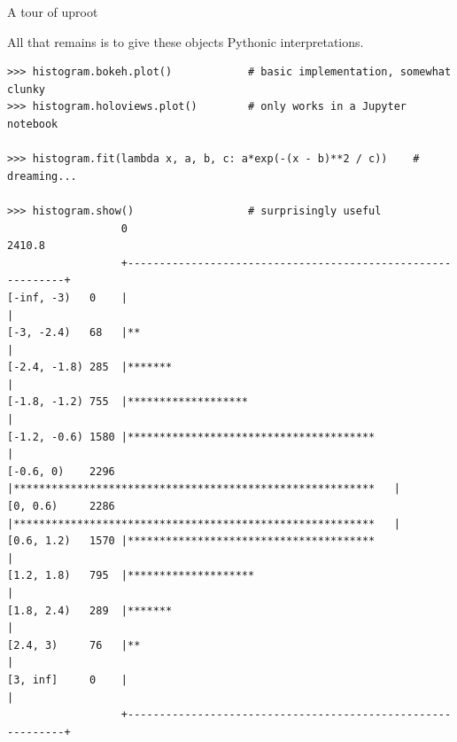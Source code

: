 \documentclass[aspectratio=169]{beamer}
\begin{document}
\begin{frame}[fragile]{A tour of uproot}
\vspace{0.4 cm}
\scriptsize

{\normalsize All that remains is to give these objects Pythonic interpretations.}

\begin{verbatim}
>>> histogram.bokeh.plot()            # basic implementation, somewhat clunky
>>> histogram.holoviews.plot()        # only works in a Jupyter notebook

>>> histogram.fit(lambda x, a, b, c: a*exp(-(x - b)**2 / c))    # dreaming...

>>> histogram.show()                  # surprisingly useful
                  0                                                       2410.8
                  +------------------------------------------------------------+
[-inf, -3)   0    |                                                            |
[-3, -2.4)   68   |**                                                          |
[-2.4, -1.8) 285  |*******                                                     |
[-1.8, -1.2) 755  |*******************                                         |
[-1.2, -0.6) 1580 |***************************************                     |
[-0.6, 0)    2296 |*********************************************************   |
[0, 0.6)     2286 |*********************************************************   |
[0.6, 1.2)   1570 |***************************************                     |
[1.2, 1.8)   795  |********************                                        |
[1.8, 2.4)   289  |*******                                                     |
[2.4, 3)     76   |**                                                          |
[3, inf]     0    |                                                            |
                  +------------------------------------------------------------+
\end{verbatim}
\end{frame}
\end{document}
